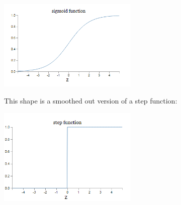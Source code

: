 {\centering
\includegraphics[width=0.5\textwidth,]{pic/sigmoidfunction01}
\par}

This shape is a smoothed out version of a step function:

{\centering
\includegraphics[width=0.5\textwidth,]{pic/stepfunction01}
\par}


